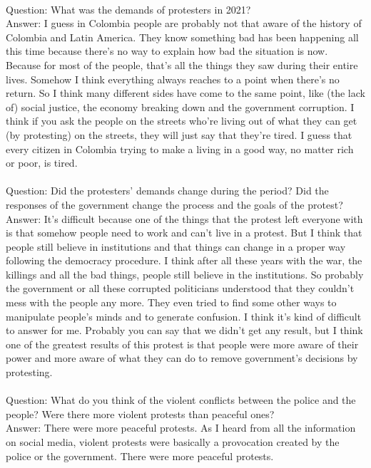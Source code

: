 \documentclass{phyasgn}\usepackage{nag}
\begin{document}
\\
Question: What was the demands of protesters in 2021?\\
Answer: I guess in Colombia people are probably not that aware of the history of Colombia and Latin America. They know something bad has been happening all this time because there’s no way to explain how bad the situation is now. Because for most of the people, that’s all the things they saw during their entire lives. Somehow I think everything always reaches to a point when there’s no return. So I think many different sides have come to the same point, like (the lack of) social justice, the economy breaking down and the government corruption. I think if you ask the people on the streets who’re living out of what they can get (by protesting) on the streets, they will just say that they’re tired. I guess that every citizen in Colombia trying to make a living in a good way, no matter rich or poor, is tired. \\
\\
Question: Did the protesters’ demands change during the period? Did the responses of the government change the process and the goals of the protest?\\
Answer: It’s difficult because one of the things that the protest left everyone with is that somehow people need to work and can’t live in a protest. But I think that people still believe in institutions and that things can change in a proper way following the democracy procedure. I think after all these years with the war, the killings and all the bad things, people still believe in the institutions. So probably the government or all these corrupted politicians understood that they couldn’t mess with the people any more. They even tried to find some other ways to manipulate people’s minds and to generate confusion. I think it’s kind of difficult to answer for me. Probably you can say that we didn’t get any result, but I think one of the greatest results of this protest is that people were more aware of their power and more aware of what they can do to remove government’s decisions by protesting.\\
\\
Question: What do you think of the violent conflicts between the police and the people? Were there more violent protests than peaceful ones?\\
Answer: There were more peaceful protests. As I heard from all the information on social media, violent protests were basically a provocation created by the police or the government. There were more peaceful protests.\\
\end{document}
